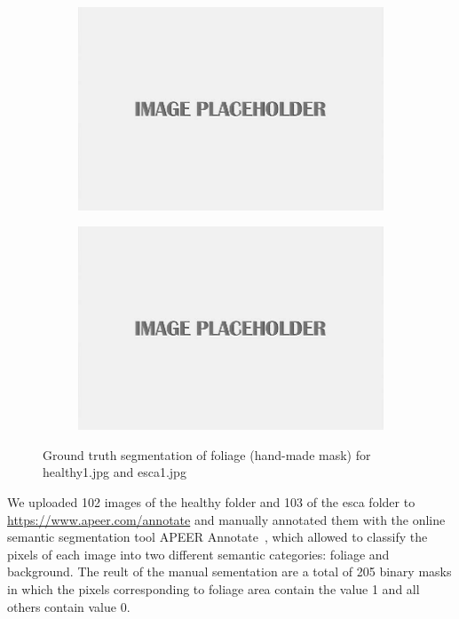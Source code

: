 \documentclass[runningheads]{llncs}
\begin{document}
\begin{figure}[h!]
\centering
\begin{subfigure}[b]{.47\linewidth}
\includegraphics[width=\linewidth]{imgs/placeholder.jpg}
\caption{}
\label{fig:sam1a}
\end{subfigure}
\begin{subfigure}[b]{.47\linewidth}
\includegraphics[width=\linewidth]{imgs/placeholder.jpg}
\caption{}
\label{fig:sam1b}
\end{subfigure}
\caption{Ground truth segmentation of foliage (hand-made mask) for {\color{red}healthy1.jpg} and {\color{red}esca1.jpg}}
\label{fig:true_segmentation}
\end{figure}

We uploaded {\color{red} 102} images of the healthy folder and {\color{red} 103} of the esca folder to \url{https://www.apeer.com/annotate} and  manually annotated them with the online semantic segmentation tool APEER Annotate~\cite{Zeiss23}, which allowed to classify the pixels of each image into two different semantic categories: foliage and background. The reult of the manual sementation are a total of {\color{red} 205} binary masks in which the pixels corresponding to foliage area contain the value 1 and all others contain value 0.
\end{document}
